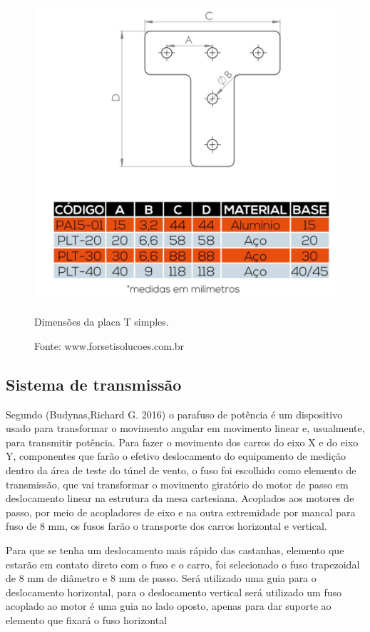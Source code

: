 \begin{figure}[!htb]
\centering
\includegraphics[scale = 0.35]{figuras/3-10}
\caption{Dimensões da placa T simples.}
\caption*{Fonte: www.forsetisolucoes.com.br}
\label{figplacatd}
\end{figure}
    
\subsection{Sistema de transmissão}

Segundo (Budynas,Richard G. 2016)  o parafuso de potência é um dispositivo usado para transformar 
o movimento angular em movimento linear e, usualmente, para transmitir potência. Para fazer o movimento 
dos carros do eixo X e do eixo Y, componentes que farão o efetivo deslocamento do equipamento de medição 
dentro da área de teste do túnel de vento, o fuso foi escolhido como elemento de transmissão, que vai 
transformar o movimento giratório do motor de passo em deslocamento linear na estrutura da mesa cartesiana. 
Acoplados aos motores de passo, por meio de acopladores de eixo e na outra extremidade por mancal para fuso 
de 8 mm, os fusos farão o transporte dos carros horizontal e vertical. 

Para que se tenha um deslocamento mais rápido das castanhas, elemento que estarão em contato 
direto com o fuso e o carro, foi selecionado o fuso trapezoidal de  8 mm de diâmetro e 8 mm de passo.  
Será utilizado uma guia para o deslocamento horizontal, para o deslocamento vertical será utilizado 
um fuso acoplado ao motor é uma guia no lado oposto, apenas para dar suporte ao elemento que fixará 
o fuso horizontal 


